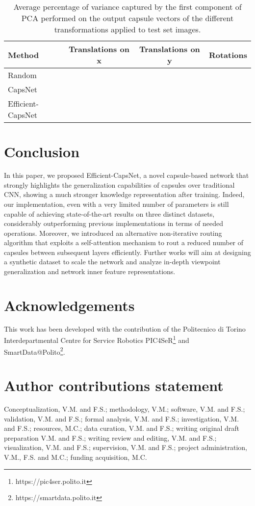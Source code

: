 \documentclass{article}
\begin{document}
\begin{table}[h]
\centering
\begin{tabular}{lccc}
\toprule
Method    & Translations on x   & Translations on y   & Rotations   \\ \hline
Random                           &    &              &   \\ 
CapsNet \cite{sabour2017dynamic} &         &               &   \\ 
Efficient-CapsNet                &         &               &   \\ \bottomrule
\end{tabular}
\caption{Average percentage of variance captured by the first component of PCA performed on the output capsule vectors of the different transformations applied to test set images.}
\label{tab:PCA}
\end{table}

\section{Conclusion}
In this paper, we proposed Efficient-CapsNet, a novel capsule-based network that strongly highlights the generalization capabilities of capsules over traditional CNN, showing a much stronger knowledge representation after training. Indeed, our implementation, even with a very limited number of parameters is still capable of achieving state-of-the-art results on three distinct datasets, considerably outperforming previous implementations in terms of needed operations. Moreover, we introduced an alternative non-iterative routing algorithm that exploits a self-attention mechanism to rout a reduced number of capsules between subsequent layers efficiently. Further works will aim at designing a synthetic dataset to scale the network and analyze in-depth viewpoint generalization and network inner feature representations.

\section*{Acknowledgements}
This work has been developed with the contribution of the Politecnico di Torino Interdepartmental Centre for Service Robotics PIC4SeR\footnote{https://pic4ser.polito.it} and SmartData@Polito\footnote{https://smartdata.polito.it}.

\section*{Author contributions statement}
Conceptualization, V.M. and F.S.; methodology, V.M.; software, V.M. and F.S.; validation, V.M. and F.S.; formal analysis, V.M. and F.S.; investigation, V.M. and F.S.; resources, M.C.; data curation, V.M. and F.S.; writing original draft preparation V.M. and F.S.; writing review and editing, V.M. and F.S.; visualization, V.M. and F.S.; supervision, V.M. and F.S.; project administration, V.M., F.S. and M.C.; funding acquisition, M.C. 


  
  
\end{document}
